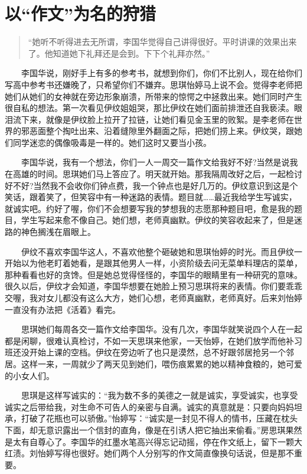 \documentclass[12pt,UTF8]{ctexbook}
\begin{document}
\hypertarget{ux4ee5ux4f5cux6587ux4e3aux540dux7684ux72e9ux730e}{%
\section*{\texorpdfstring{以\enquote{作文}为名的狩猎}{以``作文''为名的狩猎}}\label{ux4ee5ux4f5cux6587ux4e3aux540dux7684ux72e9ux730e}}

\begin{quote}
\enquote{她听不听得进去无所谓，李国华觉得自己讲得很好。平时讲课的效果出来了。他知道她下礼拜还是会到。下下个礼拜亦然。}
\end{quote}

　　李国华说，刚好手上有多的参考书，就想到你们，你们不比别人，现在给你们写高中参考书还嫌晚了，只希望你们不嫌弃。思琪怡婷马上说不会。觉得李老师把她们从她们的女神就在旁边形象崩溃，所带来的惊愕之中拯救出来。她们同时产生很自私的想法。第一次看见伊纹姐姐哭，那比伊纹在她们面前排泄还自我亵渎。眼泪流下来，就像是伊纹脸上拉开了拉链，让她们看见金玉里的败絮。是李老师在世界的邪恶面整个掏吐出来、沿着缝隙里外翻面之际，把她们捞上来。伊纹哭，跟她们同学迷恋的偶像吸毒是一样的。她们这时又要当小孩。

　　李国华说，我有一个想法，你们一人一周交一篇作文给我好不好?当然是说我在高雄的时间。思琪她们马上答应了。明天就开始。那我隔周改好之后，一起检讨好不好?当然我不会收你们钟点费，我一个钟点也是好几万的。伊纹意识到这是个笑话，跟着笑了，但笑容中有一种迷路的表情。题目就\ldots{}\ldots{}最近我给学生写诚实，就诚实吧。约好了喔，你们不会想要写我的梦想我的志愿那种题目吧，愈是我的题目，学生写起来愈不像自己。她们想，老师真幽默。伊纹的笑容收起来了，但是迷路的神色搁浅在眉眼上。

　　伊纹不喜欢李国华这人，不喜欢他整个砸破她和思琪怡婷的时光。而且伊纹一开始以为他老盯着她看，是跟其他男人一样，小资阶级去问无菜单料理店的菜单，那种看看也好的贪馋。但是她总觉得怪怪的，李国华的眼睛里有一种研究的意味。很久以后，伊纹才会知道，李国华想要在她脸上预习思琪将来的表情。你们要乖乖交喔，我对女儿都没有这么大方，她们心想，老师真幽默，老师真好。后来刘怡婷一直没有办法把《活着》看完。

　　思琪她们每周各交一篇作文给李国华。没有几次，李国华就笑说四个人在一起都是闲聊，很难认真检讨，不如一天思琪来他家，一天怡婷，在她们放学而他补习班还没开始上课的空档。伊纹在旁边听了也只是漠然，总不好跟邻居抢另一个邻居。这样一来，一周就少了两天见到她们，喂伤痕累累的她以精神食粮的，她可爱的小女人们。

　　思琪是这样写诚实的：\enquote{我为数不多的美德之一就是诚实，享受诚实，也享受诚实之后带给我，对生命不可告人的亲密与自满。诚实的真意就是：只要向妈妈坦承，打破了花瓶也可以骄傲。}怡婷写：\enquote{诚实是一封见不得人的情书，压藏在枕头下面，却无意识露出一个信封的直角，像是在引诱人把它抽出来偷看。}房思琪果然是太有自尊心了。李国华的红墨水笔高兴得忘记动摇，停在作文纸上，留下一颗大红渍。刘怡婷写得也很好。她们两个人分别写的作文简直像换句话说，但是那不重要。
\end{document}
